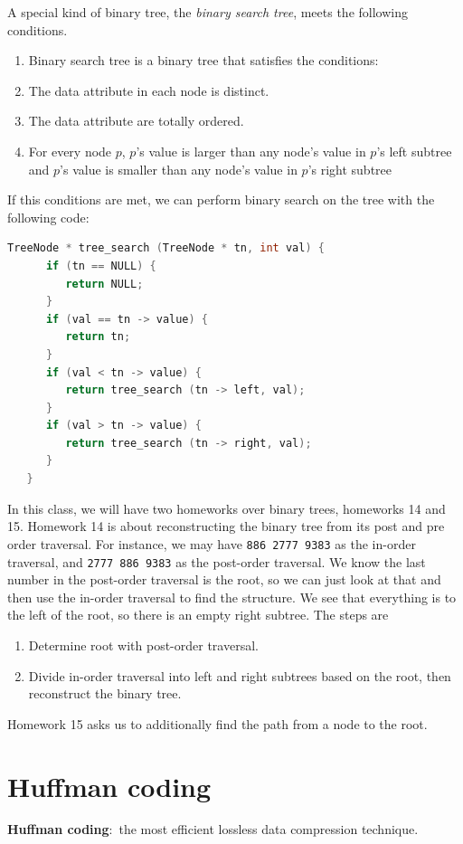 \documentclass[nobib]{tufte-handout}
\newcommand{\defn}[2]{\noindent\textbf{#1}:\ #2}
\begin{document}
A special kind of binary tree, the \emph{binary search tree}, 
meets the following conditions. 
\begin{enumerate}
   \item Binary search tree is a binary tree that satisfies the conditions:
   \item The data attribute in each node is distinct.
   \item The data attribute are totally ordered.
   \item For every node $p$, $p$'s value is larger than any node's value in $p$'s left subtree
   and $p$'s value is smaller than any node's value in $p$'s right subtree
\end{enumerate}
If this conditions are met, 
we can perform binary search 
on the tree with the 
following code:
\begin{lstlisting}[language=C, caption={Binary search with binary tree}]
   TreeNode * tree_search (TreeNode * tn, int val) {
      if (tn == NULL) {
         return NULL;
      }
      if (val == tn -> value) {
         return tn;
      }
      if (val < tn -> value) {
         return tree_search (tn -> left, val);
      }
      if (val > tn -> value) {
         return tree_search (tn -> right, val);
      }
   }
\end{lstlisting}

In this class, we will have two homeworks over binary trees, homeworks 
14 and 15. 
Homework 14 is about reconstructing the binary tree from its post and pre
order traversal. For instance, we may have \texttt{886 2777 9383} as the in-order 
traversal, and \texttt{2777 886 9383} as the post-order traversal. We know the last number 
in the post-order traversal is the root, so we can just look at that and then use the 
in-order traversal to find the structure. We see that everything is to the left of the root, 
so there is an empty right subtree. The steps are 
\begin{enumerate}
   \item Determine root with post-order traversal. 
   \item Divide in-order traversal into left and right subtrees
   based on the root, then reconstruct the binary tree. 
\end{enumerate} 
Homework 15 asks us to additionally find the path from a node 
to the root. 

\section{Huffman coding}
\defn{Huffman coding}{the most efficient lossless data compression technique}. 
\end{document}
